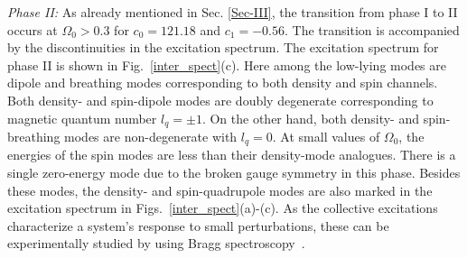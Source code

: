 \documentclass[pra,twocolumn,aps,superscriptaddress,showpacs,longbibliography]{revtex4-1}
\begin{document}
{\it Phase II:}
As already mentioned in Sec. \ref{Sec-III}, the transition from phase I to II occurs at $\Omega_0>0.3$
for $c_0 = 121.18$ and $c_1 = -0.56$. The transition
is accompanied by the discontinuities in the excitation spectrum. The excitation spectrum for phase II is shown in Fig.~\ref{inter_spect}(c).
Here among the low-lying modes are dipole and breathing modes corresponding to both density and spin channels. 
Both density- and spin-dipole modes are doubly degenerate corresponding to magnetic quantum number $l_q = \pm 1$.
On the other hand, both density- and spin-breathing modes are non-degenerate with 
$l_q = 0$. At small values of $\Omega_0$, the energies of the spin modes are less than their
density-mode analogues. There is a single zero-energy mode due to the broken gauge symmetry in this phase.
Besides these modes, the density- and spin-quadrupole modes are also marked
in the excitation spectrum in Figs.~\ref{inter_spect}(a)-(c).  As the collective excitations characterize a system’s response to small perturbations, these can be experimentally studied by using Bragg spectroscopy~\cite{PhysRevA.90.063624, PhysRevLett.114.105301}.
\end{document}
